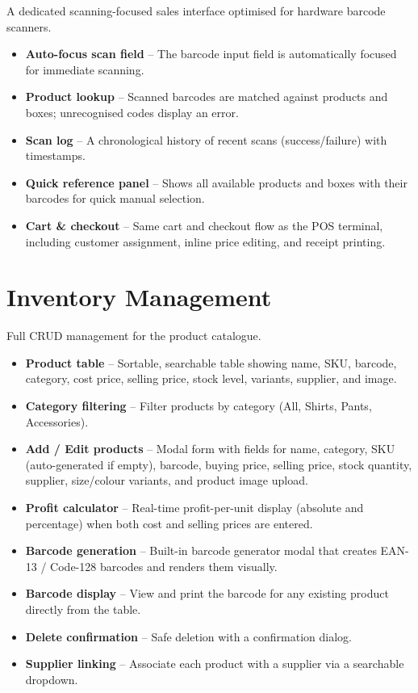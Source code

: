 \documentclass[12pt,a4paper]{article}
\begin{document}
A dedicated scanning-focused sales interface optimised for hardware barcode
scanners.

\begin{itemize}[leftmargin=1.5em]
  \item \textbf{Auto-focus scan field} -- The barcode input field is
        automatically focused for immediate scanning.
  \item \textbf{Product lookup} -- Scanned barcodes are matched against
        products and boxes; unrecognised codes display an error.
  \item \textbf{Scan log} -- A chronological history of recent scans
        (success/failure) with timestamps.
  \item \textbf{Quick reference panel} -- Shows all available products and
        boxes with their barcodes for quick manual selection.
  \item \textbf{Cart \& checkout} -- Same cart and checkout flow as the POS
        terminal, including customer assignment, inline price editing, and
        receipt printing.
\end{itemize}

\section{Inventory Management}

Full CRUD management for the product catalogue.

\begin{itemize}[leftmargin=1.5em]
  \item \textbf{Product table} -- Sortable, searchable table showing name,
        SKU, barcode, category, cost price, selling price, stock level,
        variants, supplier, and image.
  \item \textbf{Category filtering} -- Filter products by category (All,
        Shirts, Pants, Accessories).
  \item \textbf{Add / Edit products} -- Modal form with fields for name,
        category, SKU (auto-generated if empty), barcode, buying price,
        selling price, stock quantity, supplier, size/colour variants, and
        product image upload.
  \item \textbf{Profit calculator} -- Real-time profit-per-unit display
        (absolute and percentage) when both cost and selling prices are entered.
  \item \textbf{Barcode generation} -- Built-in barcode generator modal that
        creates EAN-13 / Code-128 barcodes and renders them visually.
  \item \textbf{Barcode display} -- View and print the barcode for any
        existing product directly from the table.
  \item \textbf{Delete confirmation} -- Safe deletion with a confirmation
        dialog.
  \item \textbf{Supplier linking} -- Associate each product with a supplier
        via a searchable dropdown.
\end{itemize}
\end{document}

